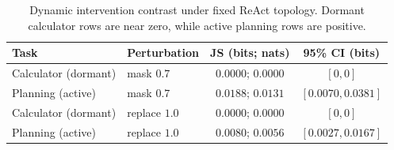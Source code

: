 \begin{table}[t]
\centering
\small
\begin{tabular}{llcc}
\toprule
Task & Perturbation & JS (bits; nats) & 95\% CI (bits) \\
\midrule
Calculator (dormant) & mask $0.7$ & $0.0000$; $0.0000$ & $[0,0]$ \\
Planning (active) & mask $0.7$ & $0.0188$; $0.0131$ & $[0.0070,0.0381]$ \\
Calculator (dormant) & replace $1.0$ & $0.0000$; $0.0000$ & $[0,0]$ \\
Planning (active) & replace $1.0$ & $0.0080$; $0.0056$ & $[0.0027,0.0167]$ \\
\bottomrule
\end{tabular}
\caption[Intervention contrast by perturbation.]{Dynamic intervention contrast under
fixed ReAct topology. Dormant calculator rows are near zero, while active
planning rows are positive.}
\label{tab:intervention-results}
\end{table}
